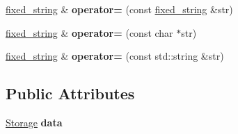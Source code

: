 \begin{DoxyCompactItemize}
\mbox{\hyperlink{classfc_1_1fixed__string}{fixed\+\_\+string}} \& {\bfseries operator=} (const \mbox{\hyperlink{classfc_1_1fixed__string}{fixed\+\_\+string}} \&str)
\item 
\mbox{\label{classfc_1_1fixed__string_ac8077227ef75a8143e0cc34550e78563}} 
\mbox{\hyperlink{classfc_1_1fixed__string}{fixed\+\_\+string}} \& {\bfseries operator=} (const char $\ast$str)
\item 
\mbox{\label{classfc_1_1fixed__string_a0d910bdf4d62661e898d1c8e835cb8fe}} 
\mbox{\hyperlink{classfc_1_1fixed__string}{fixed\+\_\+string}} \& {\bfseries operator=} (const std\+::string \&str)
\end{DoxyCompactItemize}
\subsection*{Public Attributes}
\begin{DoxyCompactItemize}
\item 
\mbox{\label{classfc_1_1fixed__string_a21c18a803dd8a7a3633ee7442fdc275b}} 
\mbox{\hyperlink{struct_storage}{Storage}} {\bfseries data}
\end{DoxyCompactItemize}
